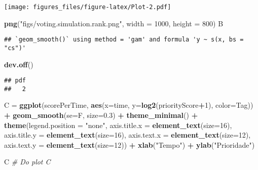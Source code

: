 \documentclass[]{article}
\newenvironment{Shaded}{\begin{snugshade}}{\end{snugshade}}
\newcommand{\CommentTok}[1]{\textcolor[rgb]{0.56,0.35,0.01}{\textit{#1}}}
\newcommand{\DataTypeTok}[1]{\textcolor[rgb]{0.13,0.29,0.53}{#1}}
\newcommand{\DecValTok}[1]{\textcolor[rgb]{0.00,0.00,0.81}{#1}}
\newcommand{\FloatTok}[1]{\textcolor[rgb]{0.00,0.00,0.81}{#1}}
\newcommand{\KeywordTok}[1]{\textcolor[rgb]{0.13,0.29,0.53}{\textbf{#1}}}
\newcommand{\NormalTok}[1]{#1}
\newcommand{\OperatorTok}[1]{\textcolor[rgb]{0.81,0.36,0.00}{\textbf{#1}}}
\newcommand{\StringTok}[1]{\textcolor[rgb]{0.31,0.60,0.02}{#1}}
\begin{document}
\texttt{[image: figures\_files/figure-latex/Plot-2.pdf]}

\begin{Shaded}
\begin{Highlighting}[]
\KeywordTok{png}\NormalTok{(}\StringTok{"figs/voting.simulation.rank.png"}\NormalTok{, }\DataTypeTok{width =} \DecValTok{1000}\NormalTok{, }\DataTypeTok{height =} \DecValTok{800}\NormalTok{)}
\NormalTok{B}
\end{Highlighting}
\end{Shaded}

\begin{verbatim}
## `geom_smooth()` using method = 'gam' and formula 'y ~ s(x, bs = "cs")'
\end{verbatim}

\begin{Shaded}
\begin{Highlighting}[]
\KeywordTok{dev.off}\NormalTok{()}
\end{Highlighting}
\end{Shaded}

\begin{verbatim}
## pdf 
##   2
\end{verbatim}

\begin{Shaded}
\begin{Highlighting}[]
\NormalTok{C =}\StringTok{ }\KeywordTok{ggplot}\NormalTok{(scorePerTime, }\KeywordTok{aes}\NormalTok{(}\DataTypeTok{x=}\NormalTok{time, }\DataTypeTok{y=}\KeywordTok{log2}\NormalTok{(priorityScore}\OperatorTok{+}\DecValTok{1}\NormalTok{), }\DataTypeTok{color=}\NormalTok{Tag)) }\OperatorTok{+}\StringTok{ }\KeywordTok{geom_smooth}\NormalTok{(}\DataTypeTok{se=}\NormalTok{F, }\DataTypeTok{size=}\FloatTok{0.3}\NormalTok{) }\OperatorTok{+}
\StringTok{  }\KeywordTok{theme_minimal}\NormalTok{() }\OperatorTok{+}\StringTok{ }\KeywordTok{theme}\NormalTok{(}\DataTypeTok{legend.position =} \StringTok{"none"}\NormalTok{, }\DataTypeTok{axis.title.x =} \KeywordTok{element_text}\NormalTok{(}\DataTypeTok{size=}\DecValTok{16}\NormalTok{),}
                          \DataTypeTok{axis.title.y =} \KeywordTok{element_text}\NormalTok{(}\DataTypeTok{size=}\DecValTok{16}\NormalTok{),}
                          \DataTypeTok{axis.text.x =} \KeywordTok{element_text}\NormalTok{(}\DataTypeTok{size=}\DecValTok{12}\NormalTok{),}
                          \DataTypeTok{axis.text.y =} \KeywordTok{element_text}\NormalTok{(}\DataTypeTok{size=}\DecValTok{12}\NormalTok{)) }\OperatorTok{+}
\StringTok{  }\KeywordTok{xlab}\NormalTok{(}\StringTok{"Tempo"}\NormalTok{) }\OperatorTok{+}\StringTok{ }\KeywordTok{ylab}\NormalTok{(}\StringTok{"Prioridade"}\NormalTok{)}

\NormalTok{C }\CommentTok{# Do plot C}
\end{Highlighting}
\end{Shaded}
\end{document}
